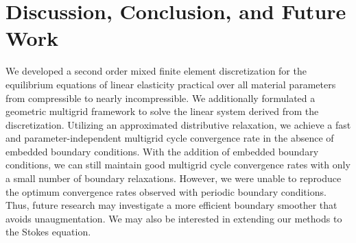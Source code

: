 \section{Discussion, Conclusion, and Future Work}

We developed a second order mixed finite element discretization for the equilibrium equations of linear elasticity practical over all material parameters from compressible to nearly incompressible. We additionally formulated a geometric multigrid framework to solve the linear system derived from the discretization. Utilizing an approximated distributive relaxation, we achieve a fast and parameter-independent multigrid cycle convergence rate in the absence of embedded boundary conditions. With the addition of embedded boundary conditions, we can still maintain good multigrid cycle convergence rates with only a small number of boundary relaxations. However, we were unable to reproduce the optimum convergence rates observed with periodic boundary conditions. Thus, future research may investigate a more efficient boundary smoother that avoids unaugmentation. We may also be interested in extending our methods to the Stokes equation.
